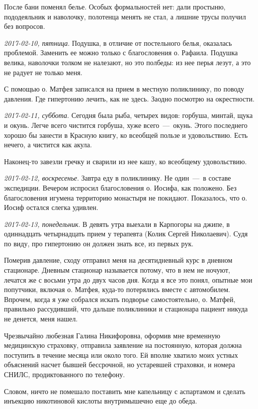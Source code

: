\documentclass[
    12pt
    ,a4paper
    ,oneside
    ,russian
]{memoir}
\newcommand{\mydatestamp}{
    \bigskip   %
    \emph
}
\newcommand{\mds}{\mydatestamp}
\begin{document}
    После бани поменял белье. Особых формальностей нет: дали простыню, пододеяльник и наволочку, полотенца менять не стал, а лишние трусы получил без вопросов.
    
    \mds{2017-02-10, пятница}. Подушка, в отличие от постельного белья, оказалась проблемой. Заменить ее можно только с благословения о. Рафаила. Подушка велика, наволочки толком не налезают, но это полбеды: из нее перья лезут, а это не радует не только меня.
    
    С помощью о. Матфея записался на прием в местную поликлинику, по поводу давления. Где гипертонию лечить, как не здесь. Заодно посмотрю на окрестности.
    
    \mds{2017-02-11, суббота}. Сегодня была рыба, четырех видов: горбуша, минтай, щука и окунь. Легче всего чистится горбуша, хуже всего~---~окунь. Этого последнего хорошо бы занести в Красную книгу, ко всеобщей пользе и удовольствию. Есть нечего, а чистится как акула.
    
    Наконец-то завезли гречку и сварили из нее кашу, ко всеобщему удовольствию.
    
    \mds{2017-02-12, воскресенье}. Завтра еду в поликлинику. Не один~---~в составе экспедиции. Вечером испросил благословения о. Иосифа, как положено. Без благословения игумена территорию монастыря не покидают. Показалось, что о. Иосиф остался слегка удивлен.
    
    \mds{2017-02-13, понедельник}. В девять утра выехали в Карпогоры на джипе, в одиннадцать четырнадцать прием у терапевта (Колик Сергей Николаевич). Судя по виду, про гипертонию он должен знать все, из первых рук.
    
    Померив давление, сходу отправил меня на десятидневный курс в дневном стационаре. Дневным стационар называется потому, что в нем не ночуют, лечатся же с восьми утра до двух часов дня. Когда я все это понял, опытные мои попутчики, включая о. Матфея, куда-то потерялись вместе с автомобилем. Впрочем, когда я уже собрался искать подворье самостоятельно, о. Матфей, правильно рассудивший, что дальше поликлиники и стационара пациент никуда не денется, меня нашел.
    
    Чрезвычайно любезная Галина Никифоровна, оформив мне временную медицинскую страховку, отправила заявление на постоянную, которая должна поступить в течение месяца или около того. Ей вполне хватило моих устных объяснений насчет бывшей бессрочной, но устаревшей страховки, и номера СНИЛС, продиктованного по телефону.
    
    Словом, ничто не помешало поставить мне капельницу с аспартамом и сделать инъекцию никотиновой кислоты внутримышечно еще до обеда.
    
\end{document}
